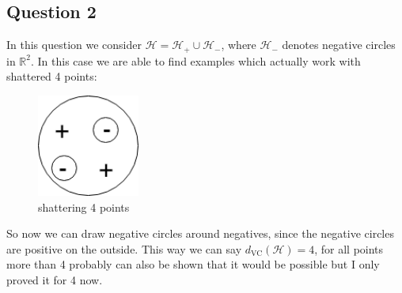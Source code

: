 \subsection{Question 2}
In this question we consider $\mathcal{H}= \mathcal{H}_+ \cup \mathcal{H}_-$, where $\mathcal{H}_-$ denotes negative circles in $\mathbb{R}^2$. 
In this case we are able to find examples which actually work with shattered 4 points:

\begin{figure}[!htb]
	\center
	\includegraphics[width=0.3\textwidth]{vc_dimension/vc-dimension-3.png}
	\caption{shattering 4 points}
\end{figure}
So now we can draw negative circles around negatives, since the negative circles are positive on the outside.
This way we can say $d_{\text{VC}}(\mathcal{H})=4$, for all points more than 4 probably can also be shown that it would be possible but I only proved it for 4 now.   